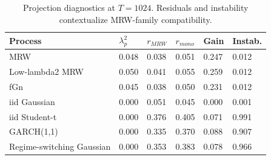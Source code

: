 \begin{table}[t]
\centering
\small
\caption{Projection diagnostics at \(T=1024\). Residuals and instability contextualize MRW-family compatibility.}
\label{tab:table2_mrw_mono_projection}
\begin{tabular}{llllll}
\toprule
Process & \(\lambda^2_p\) & \(r_{MRW}\) & \(r_{mono}\) & Gain & Instab. \\
\midrule
MRW & 0.048 & 0.038 & 0.051 & 0.247 & 0.012 \\
Low-lambda2 MRW & 0.050 & 0.041 & 0.055 & 0.259 & 0.012 \\
fGn & 0.045 & 0.038 & 0.050 & 0.231 & 0.012 \\
iid Gaussian & 0.000 & 0.051 & 0.045 & 0.000 & 0.001 \\
iid Student-t & 0.000 & 0.376 & 0.405 & 0.071 & 0.991 \\
GARCH(1,1) & 0.000 & 0.335 & 0.370 & 0.088 & 0.907 \\
Regime-switching Gaussian & 0.000 & 0.353 & 0.383 & 0.078 & 0.966 \\
\bottomrule
\end{tabular}
\end{table}
